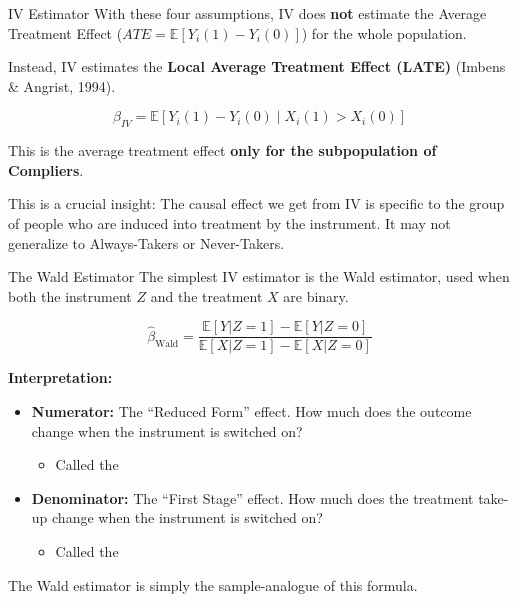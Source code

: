 \documentclass[
  ignorenonframetext,
  aspectratio=169]{beamer}
\providecommand{\tightlist}{%
  \setlength{\itemsep}{0pt}\setlength{\parskip}{0pt}}
\newcommand{\E}{\mathbb{E}}
\begin{document}
\begin{frame}{IV Estimator}
\label{iv-estimator}
With these four assumptions, IV does \textbf{not} estimate the Average
Treatment Effect (\(ATE = \E[Y_i(1) - Y_i(0)]\)) for the whole
population.

Instead, IV estimates the \textbf{Local Average Treatment Effect (LATE)}
(Imbens \& Angrist, 1994).

\[\beta_{IV} = \E[Y_i(1) - Y_i(0) \mid X_i(1) > X_i(0)]\]

This is the average treatment effect
\textbf{only for the subpopulation of Compliers}.

This is a crucial insight: The causal effect we get from IV is specific
to the group of people who are induced into treatment by the instrument.
It may not generalize to Always-Takers or Never-Takers.
\end{frame}

\begin{frame}{The Wald Estimator}
\label{the-wald-estimator}
The simplest IV estimator is the Wald estimator, used when both the
instrument \(Z\) and the treatment \(X\) are binary.

\[\hat{\beta}_{\text{Wald}} = \frac{\E[Y | Z=1] - \E[Y | Z=0]}{\E[X | Z=1] - \E[X | Z=0]}\]

\textbf{Interpretation:}

\begin{itemize}
\tightlist
\item
  \textbf{Numerator:} The ``Reduced Form'' effect. How much does the
  outcome change when the instrument is switched on?

  \begin{itemize}
  \tightlist
  \item
    Called the 
  \end{itemize}
\item
  \textbf{Denominator:} The ``First Stage'' effect. How much does the
  treatment take-up change when the instrument is switched on?

  \begin{itemize}
  \tightlist
  \item
    Called the 
  \end{itemize}
\end{itemize}

The Wald estimator is simply the sample-analogue of this formula.
\end{frame}
\end{document}
